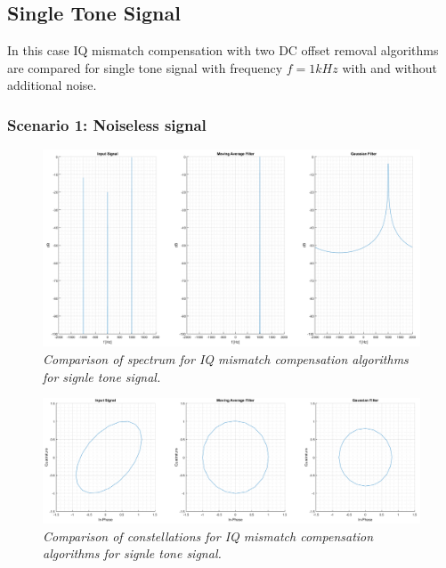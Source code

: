\documentclass[en,printmode]{mgr}
\begin{document}
	\subsection*{Single Tone Signal}
		In this case IQ mismatch compensation with two DC offset removal algorithms are compared for
		single tone signal with frequency $f=1kHz$ with and without additional noise.
		\subsubsection*{Scenario 1: Noiseless signal}
			\begin{figure}[!htb]
    			\centering
   				\includegraphics[width=\textwidth]{plots/single_f.png}
   		 		\caption{\textit{Comparison of spectrum for IQ mismatch compensation algorithms 
   		 		for signle tone signal.}}
   		 	\end{figure}
   		 	\vspace{1cm}
   		 	\begin{figure}[H]
    			\centering
   				\includegraphics[width=\textwidth]{plots/single_c.png}
   		 		\caption{\textit{Comparison of constellations for IQ mismatch compensation algorithms 
   		 		for signle tone signal.}}
			\end{figure}
		\newpage
		\newpage
\end{document}
